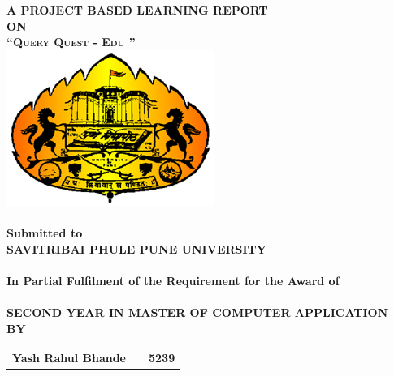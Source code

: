 \newpage
\begin{center}
\thispagestyle{empty}
\Large{\textbf{A PROJECT BASED LEARNING REPORT \\ON}}\\[0.1cm]
\Large{\textsc {\textbf{``Query Quest - Edu
''}}}\\
\vspace{0.1cm}
\includegraphics[scale=.4]{uop-logo}\\
\Large{\textbf{\\Submitted to}}
\LARGE{\textbf{\\ SAVITRIBAI PHULE PUNE UNIVERSITY\\}}
\large{\textbf{\\In Partial Fulfilment of the Requirement for the Award of\\}}
\LARGE{\textbf{\\ SECOND YEAR IN MASTER OF COMPUTER APPLICATION}}
\vspace{0.3cm}
\Large{\textbf{\\BY}}\\[0.1cm]
\begin{table}[h]
\centering
\Large{
\begin{tabular}{>{\bfseries}lc>{\bfseries}r}
  Yash Rahul Bhande & & 5239\\
  

\end{tabular}}
\end{table}
\end{center}

